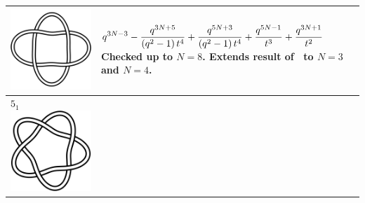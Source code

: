 \documentclass{compositio}
\theoremstyle{definition}
\numberwithin{equation}{section}
\begin{document}
{\begin{longtable}{p{}|p{}}
\includegraphics[scale=0.07,angle=0]{link4_1_2.pdf} 
& 
$
\displaystyle{%
q^{3 N-3}-\frac{q^{3N+5}}{\left(q^2-1\right) t^4}+\frac{q^{5 N+3}}{\left(q^2-1\right) t^4}+\frac{q^{5 N-1}}{t^3}+\frac{q^{3 N+1}}{t^2}
}
$
\newline\newline\newline\newline
Checked up to $N=8$. Extends result of~\cite{r0508510} to $N=3$ and $N=4$. 
\\
\hline
$5_{1}$ 
\includegraphics[scale=0.07,angle=0]{knot5_1.pdf} 

\end{longtable}}
\end{document}
